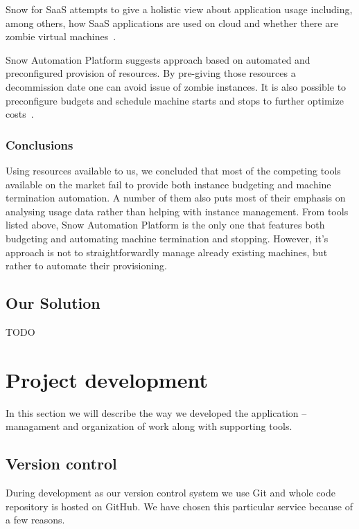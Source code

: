 \documentclass[licencjacka,en]{thesisclass}
\begin{document}
    Snow for SaaS attempts to give a holistic view about application usage including, among others,
    how SaaS applications are used on cloud and whether there are zombie virtual machines~\cite{SnowSaaS}.

    Snow Automation Platform suggests approach based on automated and preconfigured provision of resources.
    By pre-giving those resources a decommission date one can avoid issue of zombie instances.
    It is also possible to preconfigure budgets and schedule machine starts and stops to further optimize costs~\cite{SnowBlog}.

    \subsection{Conclusions}

    Using resources available to us, we concluded that most of the competing tools available on the market
    fail to provide both instance budgeting and machine termination automation.
    A number of them also puts most of their emphasis on analysing usage data rather than
    helping with instance management.
    From tools listed above, Snow Automation Platform is the only one that features both budgeting and automating
    machine termination and stopping.
    However, it's approach is not to straightforwardly manage already existing machines,
    but rather to automate their provisioning.

    \section{Our Solution}

    TODO



    \chapter{Project development}

    In this section we will describe the way we developed the application -- managament and organization of work along with supporting tools.

    \section{Version control}

    During development as our version control system we use Git and whole code repository is hosted on GitHub.
    We have chosen this particular service because of a few reasons.
\end{document}
